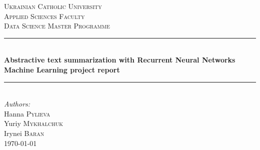 \begin{titlepage}

\newcommand{\HRule}{\rule{\linewidth}{0.5mm}} %

\center %
 

\textsc{\LARGE Ukrainian Catholic University}\\[1cm] %
\textsc{\Large Applied Sciences Faculty}\\[0.5cm] %
\textsc{\large Data Science Master Programme}\\[0.5cm] %


\HRule \\[0.4cm]
{ \huge \bfseries Abstractive text summarization with Recurrent Neural
	Networks}\\[25pt]
{\Large \bfseries Machine Learning project report}\\[0.4cm] %
\HRule \\[0.8cm]
 


\Large \emph{Authors:}\\
Hanna \textsc{Pylieva}\\Yuriy \textsc{Mykhalchuk}\\Irynei \textsc{Baran}\\[0.5cm] %


{\large \today}\\[2cm] %


\end{titlepage}

